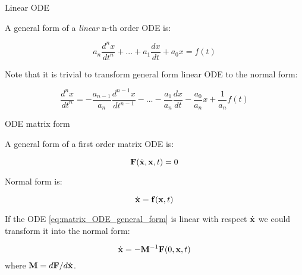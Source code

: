\documentclass{beamer}
\begin{document}
\begin{frame}{Linear ODE}
	\begin{flushleft}
		
		A general form of a \emph{linear} n-th order ODE is:
		
		\begin{equation}
			a_n \frac{d^n x}{dt^n} + ... + a_1 \frac{d x}{dt} + a_0 x  = f(t)
		\end{equation}
		
		\bigskip
		
		Note that it is trivial to transform general form linear ODE to the normal form:
		
		\begin{equation}
			\frac{d^n x}{dt^n} = -\frac{a_{n-1}}{a_n } \frac{d^{n-1} x}{dt^{n-1}} - ... - \frac{a_1}{a_n }  \frac{d x}{dt} - \frac{a_0}{a_n } x  + \frac{1}{a_n }f(t)
		\end{equation}
	
	\end{flushleft}
\end{frame}




\begin{frame}{ODE matrix form}
	\begin{flushleft}
		
		A general form of a first order matrix ODE is:
		
		\begin{equation}
			\label{eq:matrix_ODE_general_form}
			\mathbf{F}(\dot{\mathbf{x}}, \mathbf{x}, t) = 0
		\end{equation}
		
		\bigskip
		
		Normal form is:
		
		\begin{equation}
			\dot{\mathbf{x}} = \mathbf{f}(\mathbf{x}, t)
		\end{equation}
	
		If the ODE \eqref{eq:matrix_ODE_general_form} is linear with respect $\dot{\mathbf{x}}$ we could transform it into the normal form:
		
		\begin{equation}
			\dot{\mathbf{x}} = - \mathbf{M}^{-1} \mathbf{F}(0, \mathbf{x}, t) 
		\end{equation}
		where $ \mathbf{M} = d\mathbf{F} / d\dot{\mathbf{x}}$.
	
	\end{flushleft}
\end{frame}
\end{document}
